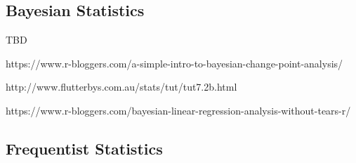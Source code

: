 \documentclass{article}\usepackage[]{graphicx}\usepackage[]{color}
\begin{document}
\subsection{Bayesian Statistics}

TBD





https://www.r-bloggers.com/a-simple-intro-to-bayesian-change-point-analysis/
	
http://www.flutterbys.com.au/stats/tut/tut7.2b.html

https://www.r-bloggers.com/bayesian-linear-regression-analysis-without-tears-r/
    
\subsection{Frequentist Statistics}
\end{document}
